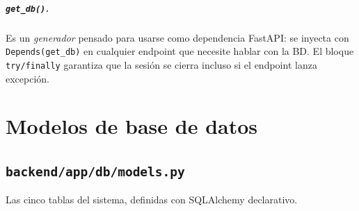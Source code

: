 \documentclass[11pt,a4paper]{book}
\begin{document}
\paragraph{\texttt{get\_db()}.} Es un \textit{generador} pensado para usarse como dependencia FastAPI: se inyecta con \texttt{Depends(get\_db)} en cualquier endpoint que necesite hablar con la BD. El bloque \texttt{try/finally} garantiza que la sesión se cierra incluso si el endpoint lanza excepción.

\chapter{Modelos de base de datos}

\section{\texttt{backend/app/db/models.py}}

Las cinco tablas del sistema, definidas con SQLAlchemy declarativo.
\end{document}
